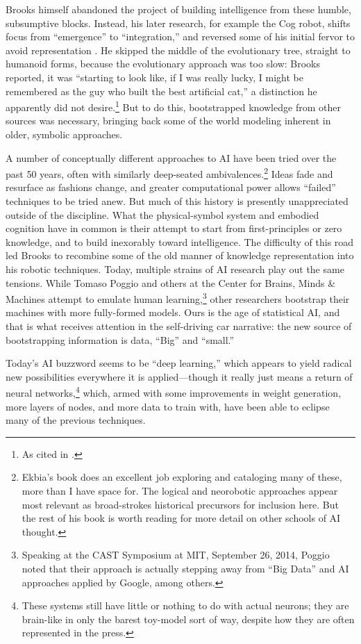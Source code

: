 Brooks himself abandoned the project of building intelligence from
these humble, subsumptive blocks. Instead, his later research, for example
the Cog robot, shifts focus from ``emergence'' to ``integration,'' and
reversed some of his initial fervor to avoid representation \cite[p.
  258]{ekbia}. He skipped the middle of the evolutionary tree, straight
to humanoid forms, because the evolutionary approach was too slow: 
Brooks reported, it was ``starting to look like, if I was really
lucky, I might be remembered as the guy who built the best artificial
cat,'' a distinction he apparently did not desire.\cite[p.
  65]{brooksflesh}\footnote{As cited in \cite[p. 258]{ekbia}.}
But to do this, bootstrapped knowledge from other sources was
necessary, bringing back some of the world modeling inherent in older,
symbolic approaches. 

A number of conceptually different approaches to AI have been tried
over the past 50 years, often with similarly deep-seated
ambivalences.\footnote{Ekbia's book does an excellent job
  exploring and cataloging many of these, more than I have space for.
  The logical and neorobotic approaches appear most relevant as
  broad-strokes historical precursors for inclusion here. But the rest
of his book is worth reading for more detail on other schools of AI thought.} Ideas fade
and resurface as fashions change, and greater computational power
allows ``failed'' techniques to be tried anew. But much of this
history is presently unappreciated outside of the discipline. What the
physical-symbol system and embodied cognition 
have in common is their attempt to start from first-principles or zero
knowledge, and to build inexorably toward intelligence. The difficulty
of this road led Brooks to recombine some of the old manner of
knowledge representation into his robotic techniques. Today, multiple
strains of AI research play out the same tensions. While Tomaso Poggio
and others at the Center for Brains, Minds \& Machines attempt to
emulate human learning,\footnote{Speaking at the CAST Symposium at
  MIT, September 26, 2014, Poggio noted that their approach is
  actually stepping away from ``Big Data'' and AI approaches applied
  by Google, among others.} other researchers bootstrap their machines
with more fully-formed models. Ours is the age of
statistical AI, and that is what receives attention in the
self-driving car narrative: the new source
of bootstrapping information is data, ``Big'' and ``small.''

Today's AI buzzword seems to be ``deep
learning,'' which appears to yield radical new possibilities everywhere it is
applied---though it really just means a return of neural
networks,\footnote{These systems still have little or nothing to do
  with actual neurons; they are brain-like in only the barest
  toy-model sort of way, despite how they are often represented in the
  press.} which, armed with some improvements in weight generation,
more layers of
nodes, and more data to train with, have been able to eclipse many of
the previous techniques.

